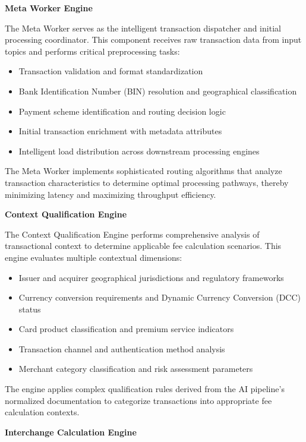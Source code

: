 \textbf{Meta Worker Engine}

The Meta Worker serves as the intelligent transaction dispatcher and initial processing coordinator. This component receives raw transaction data from input topics and performs critical preprocessing tasks:

\begin{itemize}
    \item Transaction validation and format standardization
    \item Bank Identification Number (BIN) resolution and geographical classification
    \item Payment scheme identification and routing decision logic
    \item Initial transaction enrichment with metadata attributes
    \item Intelligent load distribution across downstream processing engines
\end{itemize}

The Meta Worker implements sophisticated routing algorithms that analyze transaction characteristics to determine optimal processing pathways, thereby minimizing latency and maximizing throughput efficiency.

\textbf{Context Qualification Engine}

The Context Qualification Engine performs comprehensive analysis of transactional context to determine applicable fee calculation scenarios. This engine evaluates multiple contextual dimensions:

\begin{itemize}
    \item Issuer and acquirer geographical jurisdictions and regulatory frameworks
    \item Currency conversion requirements and Dynamic Currency Conversion (DCC) status
    \item Card product classification and premium service indicators
    \item Transaction channel and authentication method analysis
    \item Merchant category classification and risk assessment parameters
\end{itemize}

The engine applies complex qualification rules derived from the AI pipeline's normalized documentation to categorize transactions into appropriate fee calculation contexts.

\textbf{Interchange Calculation Engine}

